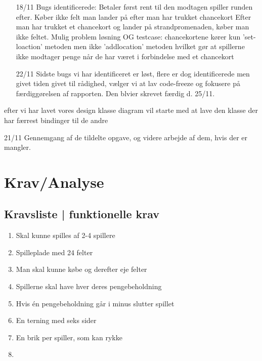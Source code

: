 \documentclass{article}
\begin{document}
\begin{itemize}
    \item [18/11]
    Bugs identificerede:
    Betaler først rent til den modtagen spiller runden efter.
    Køber ikke felt man lander på efter man har trukket chancekort
    Efter man har trukket et chancekort og lander på strandpromenaden, køber man ikke feltet. 
    Mulig problem løsning OG testcase: chancekortene kører kun 'set-loaction' metoden men ikke 'addlocation' metoden hvilket gør at spillerne ikke modtager penge når de har været i forbindelse med et chancekort
    \item [22/11]
    Sidste bugs vi har identificeret er løst, flere er dog identificerede men givet tiden givet til rådighed, vælger vi at lav code-freeze og fokusere på færdiggørelsen af rapporten. Den blvier skrevet færdig d. 25/11.
\end{itemize}
			efter vi har lavet vores design klasse diagram vil starte med at lave den klasse der har færrest bindinger til de andre 

		 \item[21/11]
            Gennemgang af de tildelte opgave, og videre arbejde af dem, hvis der er mangler. 

		
\section{Krav/Analyse}
\subsection{Kravsliste | funktionelle krav}
\begin{enumerate}
    \item Skal kunne spilles af 2-4 spillere
    \item Spilleplade med 24 felter
    \item Man skal kunne købe og derefter eje felter
    \item Spillerne skal have hver deres pengebeholdning
    \item Hvis én pengebeholdning går i minus slutter spillet
    \item En terning med seks sider
    \item En brik per spiller, som kan rykke
    \item 
\end{enumerate}
\end{document}

